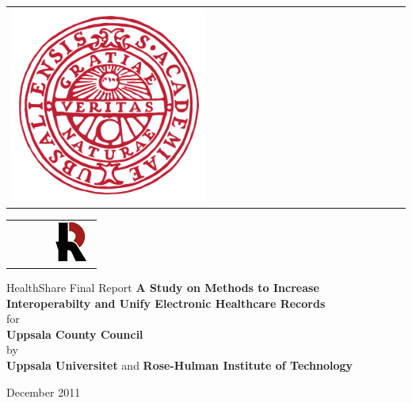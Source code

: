 \begin{titlepage}

\begin{minipage}{4cm}
\begin{tabular}{l}
\includegraphics[width=0.5\textwidth]{Images/uppsala}
\end{tabular}
\end{minipage}
\hfill
\begin{minipage}{4cm}
\begin{tabular}{r}
\includegraphics[width=0.5\textwidth]{Images/logo}
\end{tabular}
\end{minipage}


\begin{center}

\textmd{HealthShare Final Report}
\vfill
 \huge{\textbf{A Study on Methods to Increase Interoperabilty and Unify Electronic Healthcare Records } }\\[2.0cm]
for\\
\large\textbf{Uppsala County Council}\\[1.0cm]
by\\
\large{\textbf{Uppsala Universitet}} and \large{\textbf{Rose-Hulman Institute of Technology}}\\[1.0cm]

\end{center}

\begin{center}
\vfill
December 2011\\
\end{center}

\end{titlepage}